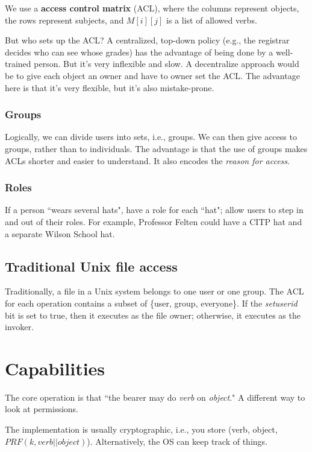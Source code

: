 \documentclass[12pt]{article}
\begin{document}
We use a \textbf{access control matrix} (ACL), where the columns represent objects, the rows represent subjects, and $M[i][j]$ is a list of allowed verbs.

But who sets up the ACL? A centralized, top-down policy (e.g., the registrar decides who can see whose grades) has the advantage of being done by a well-trained person. But it's very inflexible and slow. A decentralize approach would be to give each object an owner and have to owner set the ACL. The advantage here is that it's very flexible, but it's also mistake-prone.

\subsubsection*{Groups}

Logically, we can divide users into sets, i.e., groups. We can then give access to groups, rather than to individuals. The advantage is that the use of groups makes ACLs shorter and easier to understand. It also encodes the \textit{reason for access}.

\subsubsection*{Roles}

If a person ``wears several hats", have a role for each ``hat"; allow users to step in and out of their roles. For example, Professor Felten could have a CITP hat and a separate Wilson School hat.

\subsection*{Traditional Unix file access}

Traditionally, a file in a Unix system belongs to one user or one group. The ACL for each operation contains a subset of \{user, group, everyone\}. If the \textit{setuserid} bit is set to true, then it executes as the file owner; otherwise, it executes as the invoker.

\section*{Capabilities}

The core operation is that ``the bearer may do \textit{verb} on \textit{object}." A different way to look at permissions.

The implementation is usually cryptographic, i.e., you store (verb, object, $PRF(k, verb || object)$). Alternatively, the OS can keep track of things.
\end{document}
